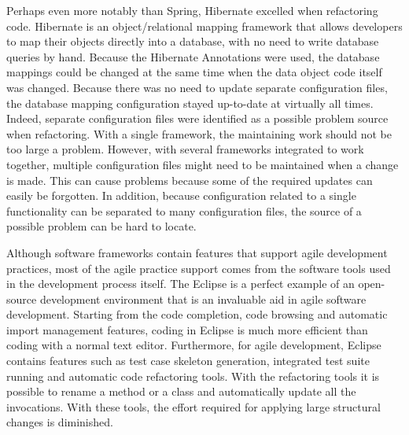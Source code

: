 Perhaps even more notably than Spring, Hibernate excelled when 
refactoring code. Hibernate is an object/relational mapping framework 
that allows developers to map their objects directly into a database, 
with no need to write database queries by hand. Because the Hibernate 
Annotations were used, the database mappings could be changed at the 
same time when the data object code itself was changed. Because there 
was no need to update separate configuration files, the database 
mapping configuration stayed up-to-date at virtually all times. 
Indeed, separate configuration files were identified as a possible 
problem source when refactoring. With a single framework, the 
maintaining work should not be too large a problem. However, with 
several frameworks integrated to work together, multiple configuration 
files might need to be maintained when a change is made. This can 
cause problems because some of the required updates can easily be 
forgotten. In addition, because configuration related to a single 
functionality can be separated to many configuration files, the source 
of a possible problem can be hard to locate.

Although software frameworks contain features that support agile 
development practices, most of the agile practice support comes from 
the software tools used in the development process itself. The Eclipse 
  is a perfect example of an open-source development 
environment that is an invaluable aid in agile software development. 
Starting from the code completion, code browsing and automatic import 
management features, coding in Eclipse is much more efficient than 
coding with a normal text editor. Furthermore, for agile development, 
Eclipse contains features such as test case skeleton generation, 
integrated test suite running and automatic code refactoring tools. 
With the refactoring tools it is possible to rename a method or a 
class and automatically update all the invocations. With these tools, 
the effort required for applying large structural changes is 
diminished.

